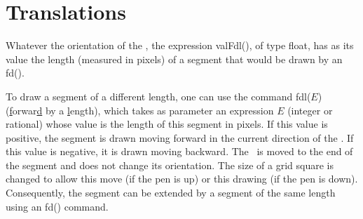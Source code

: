 \section{Translations}
Whatever the orientation of the \robot, the expression {\idt valFdl()}, of type {\idt float}, has as its value the length
 (measured in pixels) of a segment that would be drawn by an {\idt fd()}.

 To draw a segment of a different length, one can use the command {\idt fdl(}$E${\idt )}
 (\underline{f}orwar\underline{d} by a \underline{l}ength), which
 takes as parameter an expression $E$ (integer or rational) whose value is the
 length of this segment
 in pixels. If this value is positive, the segment is drawn moving forward in the
 current direction of the \robot. If this value is negative, it is drawn moving backward. The \robot\
 is moved to the end of the segment and does not change its orientation. The size
 of a grid square is changed to allow this move (if the pen is up)
 or this drawing (if the pen is down). Consequently, the segment can be extended
 by a segment of the same length using an {\idt fd()} command.

